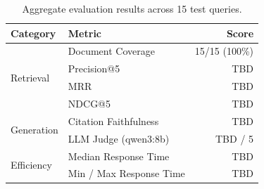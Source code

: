 \documentclass[11pt,a4paper]{article}
\begin{document}
\begin{table}[h]
\centering
\small
\caption{Aggregate evaluation results across 15 test queries.}
\label{tab:results}
\begin{tabular}{@{}llr@{}}
\toprule
\textbf{Category} & \textbf{Metric} & \textbf{Score} \\
\midrule
\multirow{4}{*}{Retrieval} & Document Coverage & 15/15 (100\%) \\
 & Precision@5 & TBD \\
 & MRR & TBD \\
 & NDCG@5 & TBD \\
\midrule
\multirow{2}{*}{Generation} & Citation Faithfulness & TBD \\
 & LLM Judge (qwen3:8b) & TBD / 5 \\
\midrule
\multirow{2}{*}{Efficiency} & Median Response Time & TBD \\
 & Min / Max Response Time & TBD \\
\bottomrule
\end{tabular}
\end{table}
\end{document}
